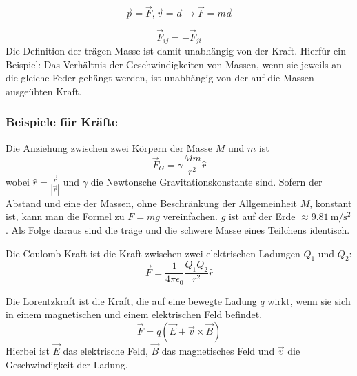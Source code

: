 \begin{definition*}
\begin{equation*}
	\dot{\vec{p}} = \vec{F}, \dot{\vec{v}} = \vec{a} \rightarrow \vec{F} = m \vec{a}
\end{equation*}
\end{definition*}

\begin{definition*}[3. Gesetz \textit{actio = reactio}]
\begin{equation*}
	\vec{F}_{ij} = -\vec{F}_{ji}
\end{equation*}
Die Definition der trägen Masse ist damit unabhängig von der Kraft. Hierfür ein Beispiel: Das Verhältnis der Geschwindigkeiten von Massen, wenn sie jeweils an die gleiche Feder gehängt werden, ist unabhängig von der auf die Massen ausgeübten Kraft.
\end{definition*}

\subsubsection{Beispiele für Kräfte}

\begin{beispiel*}[Gravitationskraft]
Die Anziehung zwischen zwei Körpern der Masse $M$ und $m$ ist 
$$\vec{F}_G = \gamma \frac{M m}{r^2} \hat{r}$$
 wobei $\hat{r} = \frac{\vec{r}}{|\vec{r}|}$ und $\gamma$ die Newtonsche Gravitationskonstante sind. Sofern der Abstand und eine der Massen, ohne Beschränkung der Allgemeinheit $M$, konstant ist, kann man die Formel zu $F = m g$ vereinfachen. $g$ ist auf der Erde $\approx \SI{9.81}{\meter\per\second\squared}$.
 Als Folge daraus sind die träge und die schwere Masse eines Teilchens identisch.
\end{beispiel*}

\begin{beispiel*}
Die Coulomb-Kraft ist die Kraft zwischen zwei elektrischen Ladungen $Q_1$ und $Q_2$:
\begin{equation*}
	\vec{F} = \frac{1}{4 \pi \epsilon_0} \frac{Q_1 Q_2}{r^2} \hat{r}
\end{equation*}
\end{beispiel*}

\begin{beispiel*}[Lorentzkraft]
Die Lorentzkraft ist die Kraft, die auf eine bewegte Ladung $q$ wirkt, wenn sie sich in einem magnetischen und einem elektrischen Feld befindet. 
\begin{equation*}
	\vec{F} = q (\vec{E} + \vec{v} \times \vec{B})
\end{equation*}
Hierbei ist $\vec{E}$ das elektrische Feld, $\vec{B}$ das magnetisches Feld und $\vec{v}$ die Geschwindigkeit der Ladung.
\end{beispiel*}

